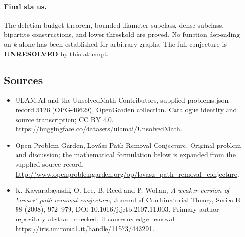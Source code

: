 \documentclass[11pt,a4paper]{article}
\begin{document}
\paragraph{Final status.}
The deletion-budget theorem, bounded-diameter subclass, dense subclass, bipartite constructions, and lower threshold are proved. No function depending on $k$ alone has been established for arbitrary graphs. The full conjecture is \textbf{UNRESOLVED} by this attempt.

\subsection{Sources}
\begin{itemize}
\item[S1] ULAM.AI and the UnsolvedMath Contributors, supplied problems.json, record 3126 (OPG-46629), OpenGarden collection. Catalogue identity and source transcription; CC BY 4.0.
\url{https://huggingface.co/datasets/ulamai/UnsolvedMath}.
\item[S2] Open Problem Garden, Lovász Path Removal Conjecture. Original problem and discussion; the mathematical formulation below is expanded from the supplied source record.
\url{http://www.openproblemgarden.org/op/lovasz_path_removal_conjecture}.
\item[R1] K. Kawarabayashi, O. Lee, B. Reed and P. Wollan, \emph{A weaker version of Lovasz' path removal conjecture}, Journal of Combinatorial Theory, Series B 98 (2008), 972--979, DOI 10.1016/j.jctb.2007.11.003. Primary author-repository abstract checked; it concerns edge removal.
\url{https://iris.uniroma1.it/handle/11573/443291}.
\end{itemize}
\end{document}
